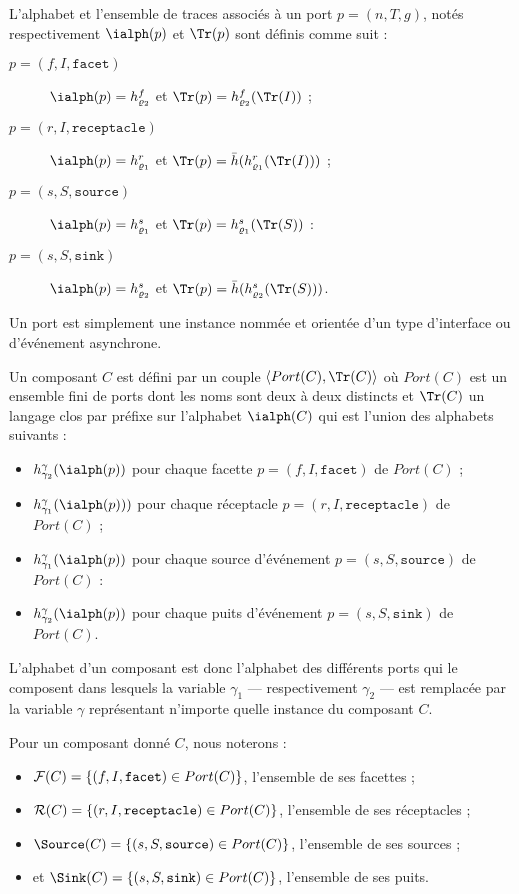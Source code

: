 L'alphabet et l'ensemble de traces associ\'es \`a un port
$p=(n,T,g)$, not\'es respectivement $\ialph(p)$ et $\Tr(p)$ sont d\'efinis comme suit :
\begin{description}
  \item[$p=(f,I,\mathtt{facet})$] $\ialph(p) = h_{\varrho_2}^f$ et $\Tr(p)= h_{\varrho_2}^{f}(\Tr(I))$ ;
  \item[$p=(r,I, \mathtt{receptacle})$] $\ialph(p) = h_{\varrho_1}^r$
  et $\Tr(p)= \bar{h}(h_{\varrho_1}^{r}(\Tr(I)))$ ;
  \item[$p=(s,S, \mathtt{source})$] $\ialph(p) = h_{\varrho_1}^s$ et $\Tr(p)= h_{\varrho_1}^{s}(\Tr(S))$  :
  \item[$p=(s,S,\mathtt{sink})$] $\ialph(p) = h_{\varrho_2}^s$ et $\Tr(p)= \bar{h}(h_{\varrho_2}^{s}(\Tr(S)))$.
\end{description}

Un port est simplement une instance nomm\'ee et orient\'ee d'un type d'interface ou
d'\'ev\'enement asynchrone.

\begin{definition}[Composant]
\label{def:typecomp}
Un composant $C$ est d\'efini par un couple $\langle Port(C),\Tr(C)\rangle$
o\`u  $Port(C)$ est un ensemble fini de ports dont les noms sont deux \`a
deux distincts et $\Tr(C)$ un langage clos par pr\'efixe
sur l'alphabet $\ialph(C)$ qui est l'union des alphabets suivants :
\begin{itemize}
  \item $h_{\gamma_2}^{\gamma}(\ialph(p))$ pour chaque facette $p=(f,
    I, \mathtt{facet}) $ de $ Port(C)$ ;
  \item $h_{\gamma_1}^{\gamma}(\ialph(p)))$ pour
    chaque r\'eceptacle $p=(r,
    I, \mathtt{receptacle}) $ de $ Port(C)$ ;
  \item $h_{\gamma_1}^{\gamma}(\ialph(p))$
  pour chaque  source d'\'ev\'enement $p=(s,S,\mathtt{source}) $ de $ Port(C)$ :
  \item $h_{\gamma_2}^{\gamma}(\ialph(p))$
  pour chaque puits d'\'ev\'enement $p=(s,S,\mathtt{sink}) $ de $ Port(C)$.
\end{itemize}
\end{definition}

L'alphabet d'un composant est donc l'alphabet des diff\'erents ports
qui le composent dans lesquels la variable $\gamma_1$  ---
respectivement $\gamma_2$  --- est remplac\'ee par la variable $\gamma$ repr\'esentant
n'importe quelle instance du
composant $C$. 

Pour un composant donn\'e $C$, nous noterons :
\begin{itemize}
  \item $\mathcal{F}(C)=\{(f,I, \mathtt{facet}) \in Port(C)\}$, l'ensemble de
  ses facettes ;
\item   $\mathcal{R}(C)=\{(r,I, \mathtt{receptacle}) \in Port(C)\}$, l'ensemble de
  ses r\'eceptacles ;
\item  $\Source(C)=\{(s,S, \mathtt{source}) \in Port(C)\}$, l'ensemble de
  ses sources ;
\item et $\Sink(C)=\{(s,S, \mathtt{sink}) \in Port(C)\}$, l'ensemble de
  ses puits.
\end{itemize}

